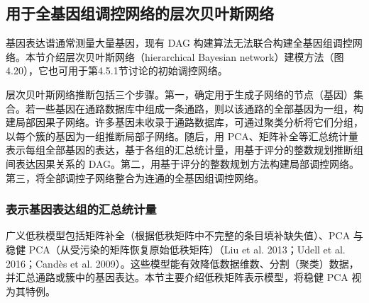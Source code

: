 \subsection{用于全基因组调控网络的层次贝叶斯网络}
基因表达谱通常测量大量基因，现有 DAG 构建算法无法联合构建全基因组调控网络。本节介绍层次贝叶斯网络（hierarchical Bayesian network）建模方法（图4.20），它也可用于第4.5.1节讨论的初始调控网络。

层次贝叶斯网络推断包括三个步骤。第一，确定用于生成子网络的节点（基因）集合。若一些基因在通路数据库中组成一条通路，则以该通路的全部基因为一组，构建局部因果子网络。许多基因未收录于通路数据库，可通过聚类分析将它们分组，以每个簇的基因为一组推断局部子网络。随后，用 PCA、矩阵补全等汇总统计量表示每组全部基因的表达，基于各组的汇总统计量，用基于评分的整数规划推断组间表达因果关系的 DAG。第二，用基于评分的整数规划方法构建局部调控网络。第三，将全部调控子网络整合为连通的全基因组调控网络。


\subsubsection{表示基因表达组的汇总统计量}
广义低秩模型包括矩阵补全（根据低秩矩阵中不完整的条目填补缺失值）、PCA 与稳健 PCA（从受污染的矩阵恢复原始低秩矩阵）（Liu et al. 2013；Udell et al. 2016；Candès et al. 2009）。这些模型能有效降低数据维数、分割（聚类）数据，并汇总通路或簇中的基因表达。本节主要介绍低秩矩阵表示模型，将稳健 PCA 视为其特例。

